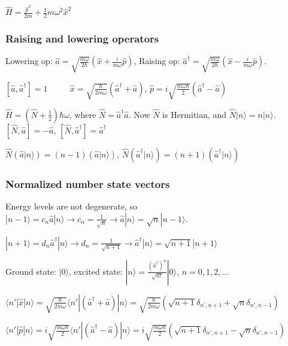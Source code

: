 $\widehat{H} = \frac{\widehat{p}^2}{2m} + \frac{1}{2} m \omega^2 \widehat{x}^2$

\subsubsection{Raising and lowering operators}

Lowering op: $\widehat{a} = \sqrt{\frac{m \omega}{2 \hbar}} (\widehat{x} + \frac{i}{m \omega} \widehat{p})$, Raising op: $\widehat{a}^{\dag} = \sqrt{\frac{m \omega}{2 \hbar}} (\widehat{x} - \frac{i}{m \omega} \widehat{p})$.

$[\widehat{a}, \widehat{a}^{\dag}] = 1$ $\qquad$ $\widehat{x} = \sqrt{\frac{\hbar}{2 m \omega}} (\widehat{a}^{\dag} + \widehat{a})$, $\widehat{p} = i \sqrt{\frac{m \omega \hbar}{2}} (\widehat{a}^{\dag} - \widehat{a})$

$\widehat{H} = (\widehat{N} + \frac{1}{2}) \hbar \omega$, where $\widehat{N} = \widehat{a}^{\dag} \widehat{a}$. Now $\widehat{N}$ is Hermitian, and $\widehat{N} | n \rangle = n | n \rangle$.
$[\widehat{N}, \widehat{a}] = -\widehat{a}$, $[\widehat{N}, \widehat{a}^{\dag}] = \widehat{a}^{\dag}$

$\widehat{N} (\widehat{a} | n \rangle) = (n-1)(\widehat{a} | n \rangle)$, $\widehat{N} (\widehat{a}^{\dag} | n \rangle) = (n + 1)(\widehat{a}^{\dag} | n \rangle)$ 

\subsubsection{Normalized number state vectors}
Energy levels are not degenerate, so
$|n - 1 \rangle = c_n \widehat{a} | n \rangle \rightarrow c_n = \frac{1}{\sqrt{n}} \rightarrow \widehat{a} | n \rangle = \sqrt{n} | n - 1 \rangle$.

$|n + 1 \rangle = d_n \widehat{a}^{\dag} | n \rangle \rightarrow d_n = \frac{1}{\sqrt{n+1}} \rightarrow \widehat{a}^{\dag} | n \rangle = \sqrt{n+1} | n + 1 \rangle$

Ground state: $|0 \rangle$, excited state: $|n \rangle = \frac{(\widehat{a}^{\dag})^n}{\sqrt{n!}} | 0 \rangle$, $n=0,1,2,...$

\tiny
$\langle n' | \widehat{x} | n \rangle = \sqrt{\frac{\hbar}{2m\omega}} \langle n' | (\widehat{a}^{\dag} + \widehat{a}) | n \rangle = \sqrt{\frac{\hbar}{2 m \omega}} (\sqrt{n+1} \delta_{n', n+1} + \sqrt{n} \delta_{n', n-1})$

$\langle n' | \widehat{p} | n \rangle = i \sqrt{\frac{m \omega \hbar}{2}} \langle n' | (\widehat{a}^{\dag} - \widehat{a}) | n \rangle = i \sqrt{\frac{m \omega \hbar}{2}} (\sqrt{n+1} \delta_{n', n+1} - \sqrt{n} \delta_{n', n-1})$

